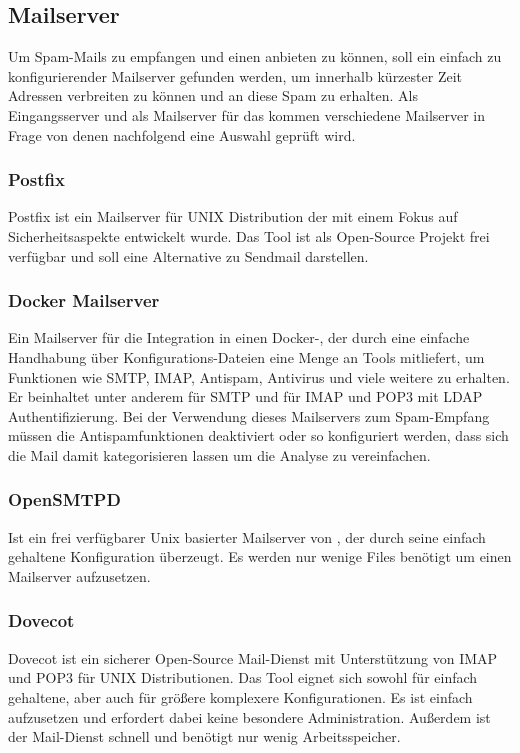 \documentclass[a4paper,11pt,singlespacing]{article}
\begin{document}
	\subsection{Mailserver}\label{sec:Mailserver}
		Um Spam-Mails zu empfangen und einen  anbieten zu können, soll ein einfach zu konfigurierender Mailserver gefunden werden, um innerhalb kürzester Zeit Adressen verbreiten zu können und an diese Spam zu erhalten.
			Als Eingangsserver und als Mailserver für das  kommen verschiedene Mailserver in Frage von denen nachfolgend eine Auswahl geprüft wird.

		\subsubsection{Postfix}\label{sec:Postfix}
			Postfix ist ein Mailserver für UNIX Distribution der mit einem Fokus auf Sicherheitsaspekte entwickelt wurde. Das Tool ist als Open-Source Projekt frei verfügbar und soll eine Alternative zu Sendmail darstellen. \cite{postfix}
		\subsubsection{Docker Mailserver}\label{sec:FullstackDockerMailserver}
			Ein Mailserver für die Integration in einen Docker-, der durch eine einfache Handhabung über Konfigurations-Dateien eine Menge an Tools mitliefert, um Funktionen wie SMTP, IMAP, Antispam, Antivirus und viele weitere zu erhalten. Er beinhaltet unter anderem  für SMTP und  für IMAP und  POP3 mit LDAP Authentifizierung. \cite{fullstackDockerMailserver} Bei der Verwendung dieses Mailservers zum Spam-Empfang müssen die Antispamfunktionen deaktiviert oder so konfiguriert werden, dass sich die Mail damit kategorisieren lassen um die Analyse zu vereinfachen.
		\subsubsection{OpenSMTPD}\label{sec:OpenSMTPD}
			Ist ein frei verfügbarer Unix basierter Mailserver von , der durch seine einfach gehaltene Konfiguration überzeugt. Es werden nur wenige Files benötigt um einen Mailserver aufzusetzen.
		\subsubsection{Dovecot}\label{sec:Dovecot}
		Dovecot ist ein sicherer Open-Source Mail-Dienst mit Unterstützung von IMAP und POP3 für UNIX Distributionen. Das Tool eignet sich sowohl für einfach gehaltene, aber auch für grö{\ss}ere komplexere Konfigurationen. Es ist einfach aufzusetzen und erfordert dabei keine besondere Administration. Au{\ss}erdem ist der Mail-Dienst schnell und benötigt nur wenig Arbeitsspeicher. \cite{dovecot}
		
\end{document}
